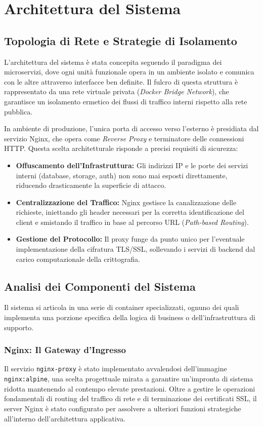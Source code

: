 \documentclass[12pt,a4paper]{report}
\begin{document}
\chapter{Architettura del Sistema}
\label{cap:architettura}

\section{Topologia di Rete e Strategie di Isolamento}
L'architettura del sistema è stata concepita seguendo il paradigma dei
microservizi, dove ogni unità funzionale opera in un ambiente isolato e comunica
con le altre attraverso interfacce ben definite. Il fulcro di questa struttura
è rappresentato da una rete virtuale privata (\textit{Docker Bridge Network}),
che garantisce un isolamento ermetico dei flussi di traffico interni rispetto
alla rete pubblica.

In ambiente di produzione, l'unica porta di accesso verso l'esterno è presidiata
dal servizio Nginx, che opera come \textit{Reverse Proxy} e terminatore delle
connessioni HTTP. Questa scelta architetturale risponde a precisi requisiti di
sicurezza:
\begin{itemize}
  \item \textbf{Offuscamento dell'Infrastruttura:} Gli indirizzi IP e le
    porte dei servizi interni (database, storage, auth) non sono mai esposti
    direttamente, riducendo drasticamente la superficie di attacco.
  \item \textbf{Centralizzazione del Traffico:} Nginx gestisce la
    canalizzazione delle richieste, iniettando gli header necessari per la
    corretta identificazione del client e smistando il traffico in base al
    percorso URL (\textit{Path-based Routing}).
  \item \textbf{Gestione del Protocollo:} Il proxy funge da punto unico per
    l'eventuale implementazione della cifratura TLS/SSL, sollevando i servizi
    di backend dal carico computazionale della crittografia.
\end{itemize}

\section{Analisi dei Componenti del Sistema}
Il sistema si articola in una serie di container specializzati, ognuno dei
quali implementa una porzione specifica della logica di business o
dell'infrastruttura di supporto.

\subsection{Nginx: Il Gateway d'Ingresso}
Il servizio \texttt{nginx-proxy} è stato implementato avvalendosi
dell'immagine \texttt{nginx:alpine}, una scelta progettuale mirata a
garantire un'impronta di sistema ridotta mantenendo al contempo
elevate prestazioni. Oltre a gestire le operazioni fondamentali di
routing del traffico di rete e di terminazione dei certificati SSL,
il server Nginx è stato configurato per assolvere a ulteriori
funzioni strategiche all'interno dell'architettura applicativa.
\end{document}
